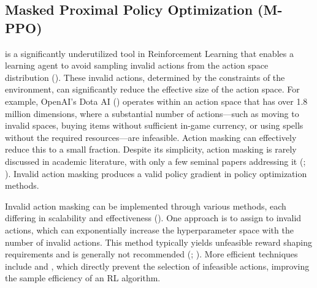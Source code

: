 \subsection{Masked Proximal Policy Optimization (M-PPO)}
\label{subsec:M-PPO}

\noindent {} is a significantly underutilized tool in Reinforcement Learning that enables a learning agent to avoid sampling invalid actions from the action space distribution (\textcolor{deepblue}{\cite{Huang_2022}}). These invalid actions, determined by the constraints of the environment, can significantly reduce the effective size of the action space. For example, OpenAI's Dota AI (\textcolor{deepblue}{\cite{openai2019dota}}) operates within an action space that has over 1.8 million dimensions, where a substantial number of actions—such as moving to invalid spaces, buying items without sufficient in-game currency, or using spells without the required resources—are infeasible. Action masking can effectively reduce this to a small fraction. Despite its simplicity, action masking is rarely discussed in academic literature, with only a few seminal papers addressing it (\textcolor{deepblue}{\cite{vinyals2017starcraft}; \cite{malmo}}). Invalid action masking produces a valid policy gradient in policy optimization methods.

\bigskip

\noindent Invalid action masking can be implemented through various methods, each differing in scalability and effectiveness (\textcolor{deepblue}{\cite{SpinningUp2018}}). One approach is to assign  to invalid actions, which can exponentially increase the hyperparameter space with the number of invalid actions. This method typically yields unfeasible reward shaping requirements and is generally not recommended (\textcolor{deepblue}{\cite{app13148283}; \cite{dietterich1999hierarchical}}). More efficient techniques include  and , which directly prevent the selection of infeasible actions, improving the sample efficiency of an RL algorithm. 

\bigskip

